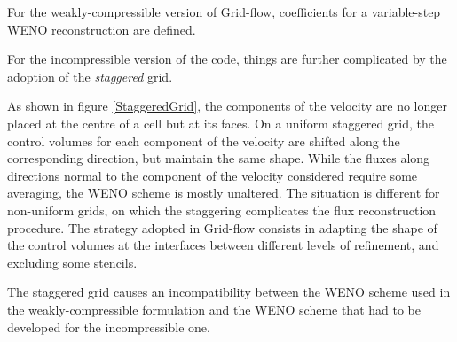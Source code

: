 \documentclass[11pt, a4paper, oneside, openany]{book}
\begin{document}
For the weakly-compressible version of Grid-flow, coefficients for a variable-step WENO reconstruction are defined.\par
For the incompressible version of the code, things are further complicated by the adoption of the \textit{staggered} grid.\par
As shown in figure \ref{StaggeredGrid}, the components of the velocity are no longer placed at the centre of a cell but at its faces. On a uniform staggered grid, the control volumes for each component of the velocity are shifted along the corresponding direction, but maintain the same shape. While the fluxes along directions normal to the component of the velocity considered require some averaging, the WENO scheme is mostly unaltered. The situation is different for non-uniform grids, on which the staggering complicates the flux reconstruction procedure. The strategy adopted in Grid-flow consists in adapting the shape of the control volumes at the interfaces between different levels of refinement, and excluding some stencils.\par
The staggered grid causes an incompatibility between the WENO scheme used in the weakly-compressible formulation and the WENO scheme that had to be developed for the incompressible one.  
\end{document}
